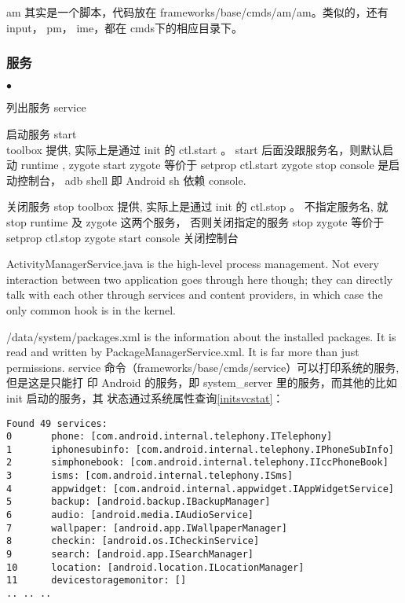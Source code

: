 \documentclass[a4paper,titlepage]{article}
\begin{document}
am 其实是一个脚本，代码放在 frameworks/base/cmds/am/am。类似的，还有input， pm， ime，都在 cmds下的相应目录下。

\subsubsection{服务}
\begin{list}{$\bullet$}{\listparam}
\item 列出服务 service
\item 启动服务 start\\
    toolbox\cite{toolbox} 提供, 实际上是通过 init 的 ctl.start 。
    start 后面没跟服务名，则默认启动 runtime ,  zygote
    start zygote  等价于  setprop  ctl.start zygote
    stop console 是启动控制台， adb shell 即 Android sh \cite{sh} 依赖 console.
\item 关闭服务 stop
    toolbox 提供, 实际上是通过 init 的 ctl.stop 。
    不指定服务名, 就stop runtime 及 zygote 这两个服务， 否则关闭指定的服务
    stop zygote 等价于 setprop ctl.stop zygote
start console 关闭控制台
\end{list}
ActivityManagerService.java is the high-level process management.  Not every interaction between two application goes through here though; they can directly talk with each other through services and content providers, in which case the only common hook is in the kernel.

/data/system/packages.xml is the information about the installed packages.  It is read and written by PackageManagerService.xml.  It is far more than just permissions.
service 命令（frameworks/base/cmds/service）可以打印系统的服务, 但是这是只能打
印 Android 的服务，即 system_server 里的服务，而其他的比如 init 启动的服务，其
状态通过系统属性查询\ref{initsvcstat}：

\begin{lstlisting}[numbers=none]
Found 49 services:
0       phone: [com.android.internal.telephony.ITelephony]
1       iphonesubinfo: [com.android.internal.telephony.IPhoneSubInfo]
2       simphonebook: [com.android.internal.telephony.IIccPhoneBook]
3       isms: [com.android.internal.telephony.ISms]
4       appwidget: [com.android.internal.appwidget.IAppWidgetService]
5       backup: [android.backup.IBackupManager]
6       audio: [android.media.IAudioService]
7       wallpaper: [android.app.IWallpaperManager]
8       checkin: [android.os.ICheckinService]
9       search: [android.app.ISearchManager]
10      location: [android.location.ILocationManager]
11      devicestoragemonitor: []
.. .. ..
\end{lstlisting}
\end{document}
